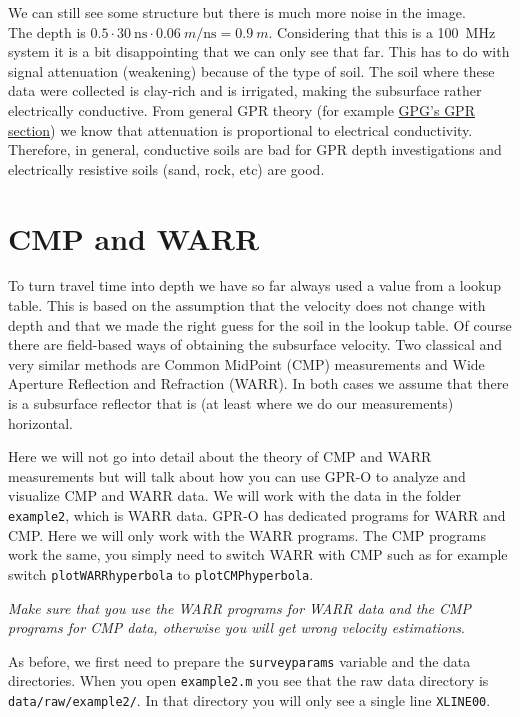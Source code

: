 \documentclass[11pt]{article}
\begin{document}
We can still see some structure but there is much more noise in the
image.  \\The depth is $0.5 \cdot \SI{30}{\ns} \cdot \SI{0.06}{m\per\ns}
= \SI{0.9}{m}$.  Considering that this is a \SI{100}{\MHz} system it is a bit
disappointing that we can only see that far. This has to do with
signal attenuation (weakening) because of the type of soil.  The soil
where these data were collected is clay-rich and is irrigated, making
the subsurface rather electrically conductive.  From general GPR
theory (for example
\href{http://gpg.geosci.xyz/content/GPR/GPR_physical_properties.html}{GPG's
  GPR section}) we know that attenuation is proportional to electrical
conductivity. Therefore, in general, conductive soils are bad for GPR
depth investigations and electrically resistive soils (sand, rock,
etc) are good.


\section{CMP and WARR}

To turn travel time into depth we have so far always used a value from
a lookup table. This is based on the assumption that the velocity does
not change with depth and that we made the right guess for the soil in
the lookup table. Of course there are field-based ways of obtaining
the subsurface velocity. Two classical and very similar methods are
Common MidPoint (CMP) measurements and Wide Aperture Reflection and
Refraction (WARR). In both cases we assume that there is a subsurface
reflector that is (at least where we do our measurements) horizontal.

Here we will not go into detail about the theory of CMP and WARR
measurements but will talk about how you can use GPR-O to analyze and
visualize CMP and WARR data. We will work with the data in the folder
\verb#example2#, which is WARR data. GPR-O has dedicated programs for
WARR and CMP. Here we will only work with the WARR programs. The CMP
programs work the same, you simply need to switch WARR with CMP such
as for example switch \verb#plotWARRhyperbola# to
\verb#plotCMPhyperbola#.

\emph{Make sure that you use the WARR programs for WARR data and the
  CMP programs for CMP data, otherwise you will get wrong velocity
  estimations}.

As before, we first need to prepare the \verb#surveyparams# variable
and the data directories. When you open \verb#example2.m# you see that
the raw data directory is \verb#data/raw/example2/#. In that directory
you will only see a single line \verb#XLINE00#.
\end{document}
